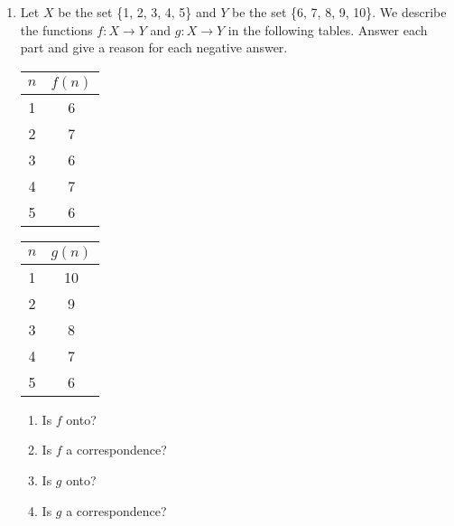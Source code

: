\documentclass{article}
\begin{document}
\begin{enumerate}
        \item Let $X$ be the set \{1, 2, 3, 4, 5\} and $Y$ be the set \{6, 7, 8, 9, 10\}. 
        We describe the functions $f : X\rightarrow Y$ and $g : X \rightarrow Y$ in the 
        following tables. Answer each part and give a reason for each negative answer.
        \begin{center}
            \begin{tabular}{c|c}
                $n$ & $f(n)$\\
                \hline
                1 & 6\\
                2 & 7\\
                3 & 6\\
                4 & 7\\
                5 & 6
            \end{tabular}
            \quad
            \begin{tabular}{c | c}
                $n$ & $g(n)$\\
                \hline
                1 & 10\\
                2 & 9\\
                3 & 8\\
                4 & 7\\
                5 & 6
            \end{tabular}
        \end{center}
        \begin{enumerate}
            \item Is $f$ onto?
            \item Is $f$ a correspondence?
            \item Is $g$ onto? 
            \item Is $g$ a correspondence?
        \end{enumerate}


\end{enumerate}
\end{document}
